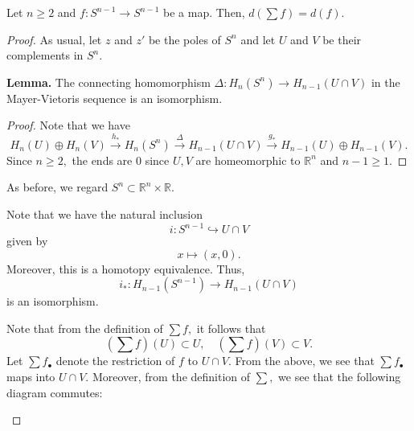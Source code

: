 \documentclass[12pt]{article}
\newenvironment{blockquote}
{\begin{mdframed}[skipabove=0pt, skipbelow=0pt, innertopmargin=4pt, innerbottommargin=4pt, bottomline=false,topline=false,rightline=false, linewidth=2pt]}
{\end{mdframed}}
\begin{document}
\begin{prop} \label{prop:suspensionsamedegree}
	Let $n \ge 2$ and $f:S^{n-1} \to S^{n-1}$ be a map. Then, $d\left(\sum f\right) = d(f).$
\end{prop}
\begin{proof} 
	As usual, let $z$ and $z'$ be the poles of $S^n$ and let $U$ and $V$ be their complements in $S^n.$

	\begin{blockquote}
		\textbf{Lemma.} The connecting homomorphism $\Delta:H_n(S^n) \to H_{n-1}(U\cap V)$ in the Mayer-Vietoris sequence is an isomorphism.

		\begin{proof} 
			Note that we have
			\begin{equation*} 
				H_n(U)\oplus H_n(V)\overset{h_*}{\longrightarrow}H_n(S^n)\overset{\Delta}{\longrightarrow}H_{n-1}(U\cap V)\overset{g_*}{\longrightarrow}H_{n-1}(U)\oplus H_{n-1}(V).
			\end{equation*}
			Since $n \ge 2,$ the ends are $0$ since $U, V$ are homeomorphic to $\mathbb{R}^n$ and $n - 1 \ge 1.$
		\end{proof}
	\end{blockquote}

	As before, we regard $S^n \subset \mathbb{R}^n\times \mathbb{R}.$

	Note that we have the natural inclusion
	\begin{equation*} 
		i:S^{n-1} \hookrightarrow U \cap V
	\end{equation*}
	given by
	\begin{equation*} 
		x \mapsto (x, 0).
	\end{equation*}
	Moreover, this is a homotopy equivalence. Thus, 
	\begin{equation*} 
		i_*:H_{n-1}(S^{n-1})\to H_{n-1}(U\cap V)
	\end{equation*}
	is an isomorphism.

	Note that from the definition of $\sum f,$ it follows that
	\begin{equation*} 
		\left(\sum f\right)(U) \subset U, \quad \left(\sum f\right)(V) \subset V.
	\end{equation*}
	Let $\sum f_\bullet$ denote the restriction of $f$ to $U\cap V.$ From the above, we see that $\sum f_\bullet$ maps into $U \cap V.$ Moreover, from the definition of $\sum,$ we see that the following diagram commutes:
	\begin{center}
	\end{center}


\end{proof}
\end{document}
